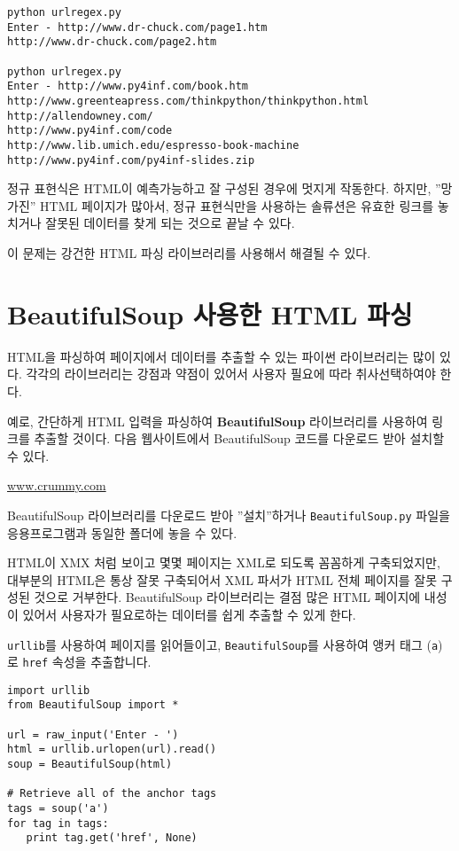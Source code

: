 \beforeverb
\begin{verbatim}
python urlregex.py 
Enter - http://www.dr-chuck.com/page1.htm
http://www.dr-chuck.com/page2.htm

python urlregex.py 
Enter - http://www.py4inf.com/book.htm
http://www.greenteapress.com/thinkpython/thinkpython.html
http://allendowney.com/
http://www.py4inf.com/code
http://www.lib.umich.edu/espresso-book-machine
http://www.py4inf.com/py4inf-slides.zip
\end{verbatim}
\afterverb
%

정규 표현식은 HTML이 예측가능하고 잘 구성된 경우에 멋지게 작동한다.
하지만, ''망가진'' HTML 페이지가 많아서, 정규 표현식만을 사용하는 솔류션은 유효한 링크를 놓치거나 잘못된 데이터를 찾게 되는 것으로 끝날 수 있다.

이 문제는 강건한 HTML 파싱 라이브러리를 사용해서 해결될 수 있다.

\section{BeautifulSoup 사용한 HTML 파싱}

HTML을 파싱하여 페이지에서 데이터를 추출할 수 있는 파이썬 라이브러리는 많이 있다.
각각의 라이브러리는 강점과 약점이 있어서 사용자 필요에 따라 취사선택하여야 한다.

예로, 간단하게 HTML 입력을 파싱하여 {\bf BeautifulSoup} 라이브러리를 사용하여 링크를 추출할 것이다.
다음 웹사이트에서 BeautifulSoup 코드를 다운로드 받아 설치할 수 있다.

\url{www.crummy.com}

BeautifulSoup 라이브러리를 다운로드 받아 ''설치''하거나 {\tt BeautifulSoup.py} 파일을 응용프로그램과 동일한 폴더에 놓을 수 있다.

HTML이 XMX 처럼 보이고 몇몇 페이지는 XML로 되도록 꼼꼼하게 구축되었지만, 대부분의 HTML은 통상 잘못 구축되어서 XML 파서가 HTML 전체 페이지를 
잘못 구성된 것으로 거부한다. BeautifulSoup 라이브러리는 결점 많은 HTML 페이지에 내성이 있어서 사용자가 필요로하는 데이터를 쉽게 추출할 수 있게 한다.

{\tt urllib}를 사용하여 페이지를 읽어들이고, {\tt BeautifulSoup}를 사용하여 앵커 태그 ({\tt a})로 {\tt href} 속성을  추출합니다.


\beforeverb
\begin{verbatim}
import urllib
from BeautifulSoup import *

url = raw_input('Enter - ')
html = urllib.urlopen(url).read()
soup = BeautifulSoup(html)

# Retrieve all of the anchor tags
tags = soup('a')
for tag in tags:
   print tag.get('href', None)
\end{verbatim}
\afterverb
%


